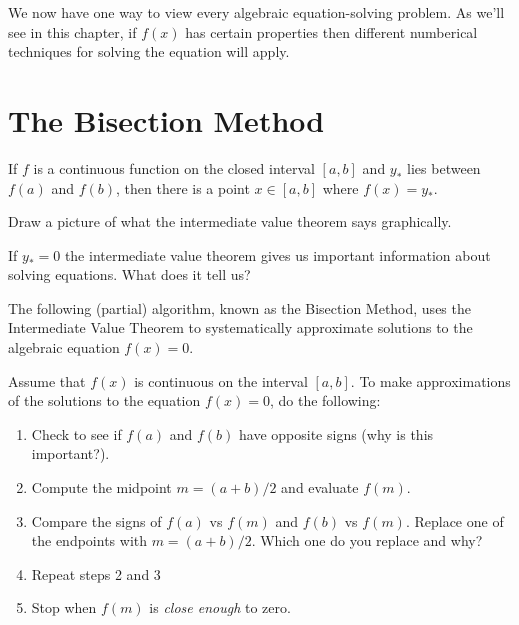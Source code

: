 We now have one way to view every algebraic equation-solving problem.  As we'll see in
this chapter, if $f(x)$ has certain properties then different numberical techniques for
solving the equation will apply.

\section{The Bisection Method}

\begin{thm}
    If $f$ is a continuous function on the closed interval $[a,b]$ and $y_*$ lies between
    $f(a)$ and $f(b)$, then there is a point $x \in [a,b]$ where $f(x) = y_*$.
    \label{thm:IVT}
\end{thm}


\begin{problem}
    Draw a picture of what the intermediate value theorem says graphically.
\end{problem}

\begin{problem}
    If $y_*=0$ the intermediate value theorem gives us important information about solving
    equations.  What does it tell us?
\end{problem}


The following (partial) algorithm, known as the Bisection Method, uses the Intermediate
Value Theorem to systematically approximate solutions to the algebraic equation $f(x) =
0$.
\begin{algorithm}
    Assume that $f(x)$ is continuous on the interval $[a,b]$. To make approximations of
    the solutions to the equation $f(x) = 0$, do the following:
    \begin{enumerate}
        \item Check to see if $f(a)$ and $f(b)$ have opposite signs
            (why is this important?).
        \item Compute the midpoint $m=(a+b)/2$ and evaluate $f(m)$.
        \item Compare the signs of $f(a)$ vs $f(m)$ and $f(b)$ vs $f(m)$.  Replace one of
            the endpoints with $m=(a+b)/2$. Which one do you replace and why?
        \item Repeat steps 2 and 3
        \item Stop when $f(m)$ is {\it close enough} to zero.
    \end{enumerate}
\end{algorithm}

